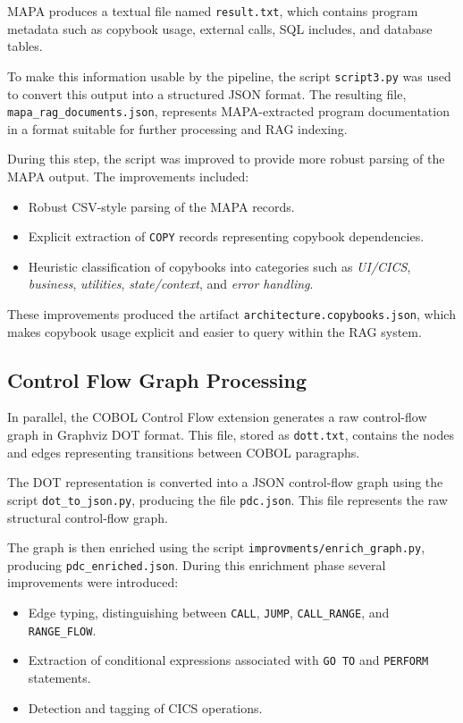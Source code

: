\documentclass[11pt]{article}
\begin{document}
MAPA produces a textual file named \texttt{result.txt}, which contains program metadata such as copybook usage, external calls, SQL includes, and database tables. 

To make this information usable by the pipeline, the script \texttt{script3.py} was used to convert this output into a structured JSON format. The resulting file, \texttt{mapa\_rag\_documents.json}, represents MAPA-extracted program documentation in a format suitable for further processing and RAG indexing.

During this step, the script was improved to provide more robust parsing of the MAPA output. The improvements included:

\begin{itemize}
\item Robust CSV-style parsing of the MAPA records.
\item Explicit extraction of \texttt{COPY} records representing copybook dependencies.
\item Heuristic classification of copybooks into categories such as \textit{UI/CICS}, \textit{business}, \textit{utilities}, \textit{state/context}, and \textit{error handling}.
\end{itemize}

These improvements produced the artifact \texttt{architecture.copybooks.json}, which makes copybook usage explicit and easier to query within the RAG system.

\subsection*{Control Flow Graph Processing}

In parallel, the COBOL Control Flow extension generates a raw control-flow graph in Graphviz DOT format. This file, stored as \texttt{dott.txt}, contains the nodes and edges representing transitions between COBOL paragraphs.

The DOT representation is converted into a JSON control-flow graph using the script \texttt{dot\_to\_json.py}, producing the file \texttt{pdc.json}. This file represents the raw structural control-flow graph.

The graph is then enriched using the script \texttt{improvments/enrich\_graph.py}, producing \texttt{pdc\_enriched.json}. During this enrichment phase several improvements were introduced:

\begin{itemize}
\item Edge typing, distinguishing between \texttt{CALL}, \texttt{JUMP}, \texttt{CALL\_RANGE}, and \texttt{RANGE\_FLOW}.
\item Extraction of conditional expressions associated with \texttt{GO TO} and \texttt{PERFORM} statements.
\item Detection and tagging of CICS operations.
\end{itemize}
\end{document}
